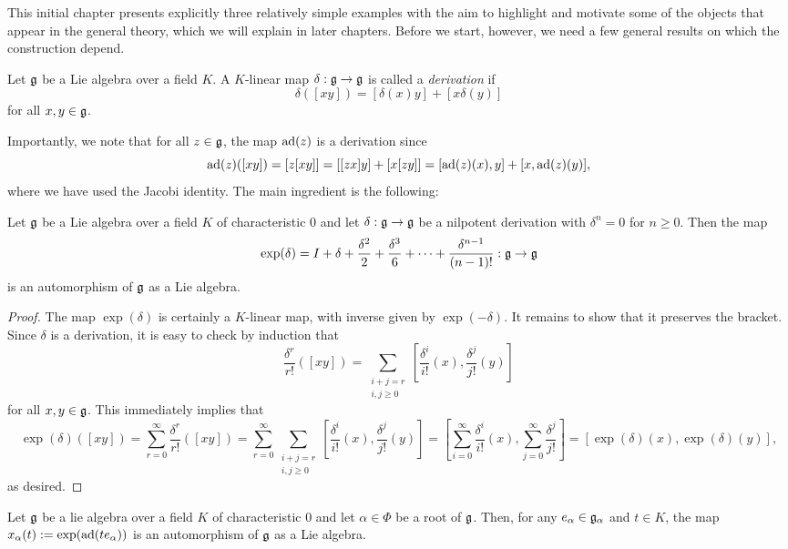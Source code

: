
This initial chapter presents explicitly three relatively simple examples with the aim to highlight and motivate some of the objects that appear in the general theory, which we will explain in later chapters. Before we start, however, we need a few general results on which the construction depend. 
\begin{definition}
    Let $\mathfrak{g}$ be a Lie algebra over a field $K$. A $K$-linear map $\delta:\mathfrak{g}\to\mathfrak{g}$ is called a \textit{derivation} if 
    $$\delta([xy])=[\delta(x)y]+[x\delta(y)]$$
    for all $x,y\in\mathfrak{g}$.
\end{definition}
Importantly, we note that for all $z\in\mathfrak{g}$, the map $\mathrm{ad}(z)$ is a derivation since $$\mathrm{ad}(z)([xy])=[z[xy]]=[[zx]y]+[x[zy]]=[\mathrm{ad}(z)(x),y]+[x,\mathrm{ad}(z)(y)],$$
where we have used the Jacobi identity. The main ingredient is the following:

\begin{proposition}
Let $\mathfrak{g}$ be a Lie algebra over a field $K$ of characteristic $0$ and let $\delta:\mathfrak{g}\to\mathfrak{g}$ be a nilpotent derivation with $\delta^n=0$ for $n\geq 0$. Then the map $$\exp(\delta)=I+\delta+\frac{\delta^2}{2}+\frac{\delta^3}{6}+\dots+\frac{\delta^{n-1}}{(n-1)!}:\mathfrak{g}\rightarrow\mathfrak{g}$$
is an automorphism of $\mathfrak{g}$ as a Lie algebra.
\end{proposition}
\begin{proof}
    The map $\exp(\delta)$ is certainly a $K$-linear map, with inverse given by $\exp(-\delta)$. It remains to show that it preserves the bracket. Since $\delta$ is a derivation, it is easy to check by induction that 
    $$\frac{\delta^r}{r!}([xy])=\sum_{\substack{i+j=r \\ i,j\geq 0}}\left[\frac{\delta^i}{i!}(x),\frac{\delta^{j}}{j!}(y)\right]$$ 
    for all $x,y\in\mathfrak{g}$. This immediately implies that
    $$\exp(\delta)([xy])=\sum_{r=0}^{\infty}\frac{\delta^r}{r!}([xy])=\sum_{r=0}^{\infty}\sum_{\substack{i+j=r \\ i,j\geq 0}}\left[\frac{\delta^i}{i!}(x),\frac{\delta^{j}}{j!}(y)\right]=\left[\sum_{i=0}^\infty\frac{\delta^i}{i!}(x),\sum_{j=0}^{\infty}\frac{\delta^j}{j!}\right]=[\exp(\delta)(x),\exp(\delta)(y)],$$
    as desired.
\end{proof}
\begin{cor}
    Let $\mathfrak{g}$ be a lie algebra over a field $K$ of characteristic $0$ and let $\alpha\in\Phi$ be a root of $\mathfrak{g}$. Then, for any $e_\alpha\in\mathfrak{g}_\alpha$ and $t\in K$, the map $x_\alpha(t):=\exp(\mathrm{ad}(te_\alpha))$ is an automorphism of $\mathfrak{g}$ as a Lie algebra.
\end{cor}

